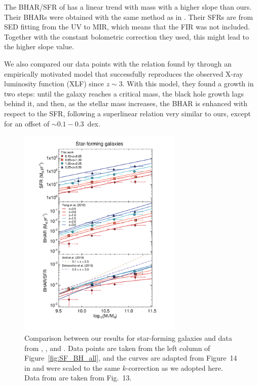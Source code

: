 The BHAR/SFR of \citet{2019MNRAS.484.4360A} has a linear trend with mass with a higher slope than ours. Their BHARs were obtained with the same method as in \citet{2018MNRAS.474.1225A}. Their SFRs are from SED fitting from the UV to MIR, which means that the FIR was not included. Together with the constant bolometric correction they used, this might lead to the higher slope value.
   
   We also compared our data points with the relation found by \citet{2019ApJ...885L..36D} through an empirically motivated model that successfully reproduces the observed X-ray luminosity function (XLF) since $z\sim3$. With this model, they found a growth in two steps: until the galaxy reaches a critical mass, the black hole growth lags behind it, and then, as the stellar mass increases, the BHAR is enhanced with respect to the SFR, following a superlinear relation very similar to ours, except for an offset of $\sim0.1-0.3$~dex.

   \begin{figure}%
   \centering
   \includegraphics[trim={1.8cm 1.5cm 2.3cm 0.8cm}, clip, width=0.7\textwidth]{Figs/Chapter2/SF_BH_SF_Yang.pdf}
      \caption{ Comparison between our results for star-forming galaxies and data from \citet{2018MNRAS.475.1887Y}, \citet{2019MNRAS.484.4360A}, and \citet{2019ApJ...885L..36D}.
            Data points are taken from the left column of Figure~\ref{fig:SF_BH_all}, and the curves are adapted from Figure~14 in \citet{2018MNRAS.475.1887Y} and were scaled to the same $k$-correction as we adopted here.
            Data from \citet{2019MNRAS.484.4360A} are taken from Fig.~13.
              }
         \label{fig:conf_yang}
   \end{figure}

